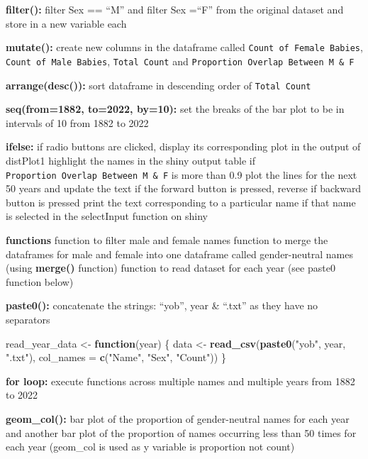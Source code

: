 \documentclass[
]{article}
\newenvironment{Shaded}{\begin{snugshade}}{\end{snugshade}}
\newcommand{\AttributeTok}[1]{\textcolor[rgb]{0.13,0.29,0.53}{#1}}
\newcommand{\ControlFlowTok}[1]{\textcolor[rgb]{0.13,0.29,0.53}{\textbf{#1}}}
\newcommand{\FunctionTok}[1]{\textcolor[rgb]{0.13,0.29,0.53}{\textbf{#1}}}
\newcommand{\NormalTok}[1]{#1}
\newcommand{\OtherTok}[1]{\textcolor[rgb]{0.56,0.35,0.01}{#1}}
\newcommand{\StringTok}[1]{\textcolor[rgb]{0.31,0.60,0.02}{#1}}
\begin{document}
\textbf{filter():} filter Sex == ``M'' and filter Sex =``F'' from the
original dataset and store in a new variable each

\textbf{mutate():} create new columns in the dataframe called
\texttt{Count\ of\ Female\ Babies}, \texttt{Count\ of\ Male\ Babies},
\texttt{Total\ Count} and
\texttt{Proportion\ Overlap\ Between\ M\ \&\ F}

\textbf{arrange(desc()):} sort dataframe in descending order of
\texttt{Total\ Count}

\textbf{seq(from=1882, to=2022, by=10):} set the breaks of the bar plot
to be in intervals of 10 from 1882 to 2022

\textbf{ifelse:} if radio buttons are clicked, display its corresponding
plot in the output of distPlot1 highlight the names in the shiny output
table if \texttt{Proportion\ Overlap\ Between\ M\ \&\ F} is more than
0.9 plot the lines for the next 50 years and update the text if the
forward button is pressed, reverse if backward button is pressed print
the text corresponding to a particular name if that name is selected in
the selectInput function on shiny

\textbf{functions} function to filter male and female names function to
merge the dataframes for male and female into one dataframe called
gender-neutral names (using \textbf{merge()} function) function to read
dataset for each year (see paste0 function below)

\textbf{paste0():} concatenate the strings: ``yob'', year \& ``.txt'' as
they have no separators

\begin{Shaded}
\begin{Highlighting}[]
\NormalTok{read\_year\_data }\OtherTok{\textless{}{-}} \ControlFlowTok{function}\NormalTok{(year) \{}
\NormalTok{  data }\OtherTok{\textless{}{-}} \FunctionTok{read\_csv}\NormalTok{(}\FunctionTok{paste0}\NormalTok{(}\StringTok{"yob"}\NormalTok{, year, }\StringTok{".txt"}\NormalTok{), }\AttributeTok{col\_names =} \FunctionTok{c}\NormalTok{(}\StringTok{"Name"}\NormalTok{, }\StringTok{"Sex"}\NormalTok{, }\StringTok{"Count"}\NormalTok{))}
\NormalTok{\}}
\end{Highlighting}
\end{Shaded}

\textbf{for loop:} execute functions across multiple names and multiple
years from 1882 to 2022

\textbf{geom\_col():} bar plot of the proportion of gender-neutral names
for each year and another bar plot of the proportion of names occurring
less than 50 times for each year (geom\_col is used as y variable is
proportion not count)
\end{document}
